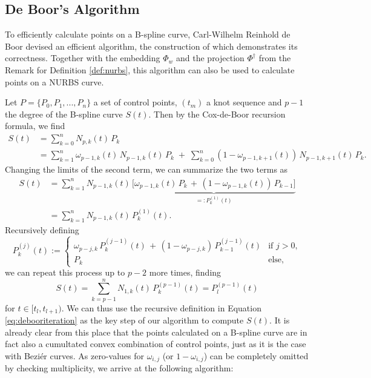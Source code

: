 \documentclass[a4paper, 11pt]{report}
\theoremstyle{definition}
\begin{document}
\subsection{De Boor's Algorithm}
To efficiently calculate points on a B-spline curve, Carl-Wilhelm Reinhold de Boor devised an efficient algorithm, the construction of which demonstrates its correctness. Together with the embedding $\Phi_w$ and the projection $\Phi^\dagger$ from the Remark for Definition \ref{def:nurbs}, this algorithm can also be used to calculate points on a NURBS curve.

Let $P = \{P_0, P_1, ..., P_n\}$ a set of control points, $(t_m)$ a knot sequence and $p-1$ the degree of the B-spline curve $S(t)$. Then by the Cox-de-Boor recursion formula, we find
\begin{align*}
	S(t) 	&= \sum_{k=0}^n N_{p,k}(t) \, P_k \\
			&= \sum_{k=1}^n \omega_{p-1,k}(t) \, N_{p-1, k}(t) \, P_k  \; + \; \sum_{k=0}^n \left( 1-\omega_{p-1,k+1}(t) \right) \, N_{p-1, k+1}(t) \, P_k.
\end{align*}
Changing the limits of the second term, we can summarize the two terms as
\begin{align*} 
	S(t) 	&= \sum_{k=1}^n N_{p-1, k}(t) \, \underbrace{\Big[ \omega_{p-1,k}(t) \, P_k  \, + \, \left( 1-\omega_{p-1,k}(t) \right) \, P_{k-1} \Big]}_{=: P_k^{(1)}(t)} \\
			&= \sum_{k=1}^n N_{p-1, k}(t) \, P_k^{(1)}(t).
\end{align*}
Recursively defining
\begin{equation}\label{eq:debooriteration}
	P^{(j)}_k(t) := \begin{cases}
		\omega_{p-j, k} \, P^{(j-1)}_k(t) \, + \, (1-\omega_{p-j, k}) \, P^{(j-1)}_{k-1}(t) 	&\text{if } j > 0,\\
		P_k 																					&\text{else},
	\end{cases}
\end{equation}
we can repeat this process up to $p-2$ more times, finding
$$ S(t) = \sum_{k=p-1}^n N_{1, k}(t) \, P^{(p-1)}_k(t) = P^{(p-1)}_l(t)$$
for $t \in [t_l, t_{l+1})$. We can thus use the recursive definition in Equation \ref{eq:debooriteration} as the key step of our algorithm to compute $S(t)$. It is already clear from this place that the points calculated on a B-spline curve are in fact also a cumultated convex combination of control points, just as it is the case with Beziér curves. As zero-values for $\omega_{i,j}$ (or $1-\omega_{i,j}$) can be completely omitted by checking multiplicity, we arrive at the following algorithm:
\end{document}
